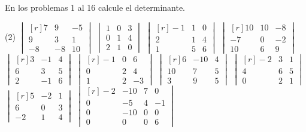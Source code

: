 \noindent
En los problemas 1 al 16 calcule el determinante.
\begin{tasks}[
    style=enumerate,
    label-offset = 3mm,
    ](2)
    \task $\begin{vmatrix*}[r]7 & 9 & -5 \\ 9 & 3 & 1 \\ -8 & -8 & 10\end{vmatrix*}$
    \task $\begin{vmatrix*}1 & 0 & 3 \\ 0 & 1 & 4 \\ 2 & 1 & 0\end{vmatrix*}$
    \task $\begin{vmatrix*}[r]-1 & 1 & 0 \\ 2 & 1 & 4 \\ 1 & 5 & 6\end{vmatrix*}$
    \task $\begin{vmatrix*}[r]10 & 10 & -8 \\ -7 & 0 & -2 \\ 10 & 6 & 9\end{vmatrix*}$
    \task $\begin{vmatrix*}[r]3 & -1 & 4 \\ 6 & 3 & 5 \\ 2 & -1 & 6\end{vmatrix*}$
    \task $\begin{vmatrix*}[r]-1 & 0 & 6 \\ 0 & 2 & 4 \\ 1 & 2 & -3\end{vmatrix*}$
    \task $\begin{vmatrix*}[r]6 & -10 & 4 \\ 10 & 7 & 5 \\ 3 & 9 & 5\end{vmatrix*}$
    \task $\begin{vmatrix*}[r]-2 & 3 & 1 \\ 4 & 6 & 5 \\ 0 & 2 & 1\end{vmatrix*}$
    \task $\begin{vmatrix*}[r]5 & -2 & 1 \\ 6 & 0 & 3 \\ -2 & 1 & 4\end{vmatrix*}$
    \task $\begin{vmatrix*}[r]-2 & -10 & 7 & 0 \\ 0 & -5 & 4 & -1 \\ 0 & -10 & 0 & 0 \\ 0 & 0 & 0 & 6\end{vmatrix*}$

\end{tasks}
